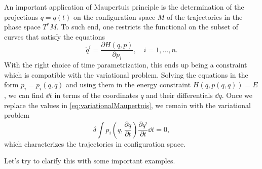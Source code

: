 \documentclass[english,fontsize=11pt,paper=b5]{scrbook}
\theoremstyle{definition}
\begin{document}
    An important application of Maupertuis principle is the determination of the projections $q=q(t)$ on the configuration space $M$ of the trajectories in the phase space $T^*M$.
    To such end, one restricts the functional on the subset of curves that satisfy the equations
    \begin{equation}
      \dot q^i = \frac{\partial H(q,p)}{\partial p_i}, \quad i=1,\ldots,n.
    \end{equation}
    With the right choice of time parametrization, this ends up being a constraint which is compatible with the variational problem.
    Solving the equations in the form $p_i = p_i(q,\dot q)$ and using them in the energy constraint $H(q, p(q,\dot q))=E$, we can find $\dd t$ in terms of the coordinates $q$ and their differentials $\dd q$. Once we replace the values in \eqref{eq:variationalMaupertuis}, we remain with the variational problem
    \begin{equation}
      \delta \int p_i\left(q, \frac{\partial q}{\partial t}\right) \frac{\partial q^i}{\partial t} \dd t = 0,
    \end{equation}
    which characterizes the trajectories in configuration space.

    Let's try to clarify this with some important examples.
\end{document}

